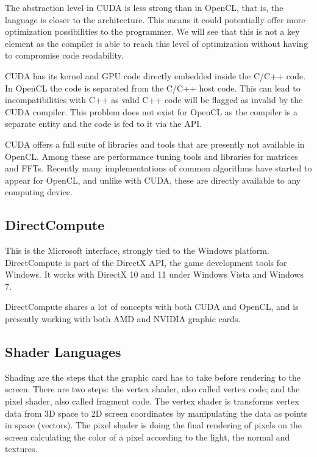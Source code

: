 The abstraction level in \gls{CUDA} is less strong than in \gls{OpenCL}, that is, the language is closer to the architecture. This means it could potentially offer more optimization possibilities to the programmer. We will see that this is not a key element as the compiler is able to reach this level of optimization without having to compromise code readability.

\Gls{CUDA} has its kernel and \gls{GPU} code directly embedded inside the C/C++ code. In \gls{OpenCL} the code is separated from the C/C++ host code. This can lead to incompatibilities with C++ as valid C++ code will be flagged as invalid by the \gls{CUDA} compiler. This problem does not exist for \gls{OpenCL} as the compiler is a separate entity and the code is fed to it via the \gls{API}. 

\Gls{CUDA} offers a full suite of libraries and tools that are presently not available in \gls{OpenCL}. Among these are performance tuning tools and libraries for matrices and \glspl{FFT}. Recently many implementations of common algorithms have started to appear for \gls{OpenCL}, and unlike with \gls{CUDA}, these are directly available to any computing device.

\subsection{DirectCompute}

This is the Microsoft interface, strongly tied to the Windows platform. DirectCompute is part of the DirectX API, the game development tools for Windows. It works with DirectX 10 and 11 under Windows Vista and Windows 7. 

DirectCompute shares a lot of concepts with both \gls{CUDA} and \gls{OpenCL}, and is presently working with both AMD and NVIDIA graphic cards.

\subsection{Shader Languages}

Shading are the steps that the graphic card has to take before
rendering to the screen. There are two steps: the vertex shader, also
called vertex code; and the pixel shader, also called fragment
code. The vertex shader is transforms vertex data from 3D space to 2D
screen coordinates by manipulating the data as points in space
(vectors). The pixel shader is doing the final rendering of pixels on
the screen calculating the color of a pixel according to the light,
the normal and textures.

